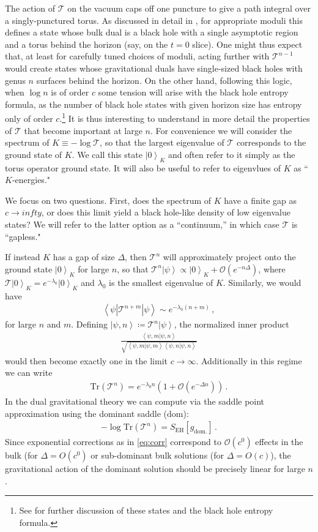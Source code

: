 \documentclass[letterpaper,12pt]{article}
\def\DM#1{{\color{red}{ [#1]}}}
\newcommand{\ban}[1]{\begin{align}#1\end{align}}
\newcommand{\corr}[1]{\left< #1\right>}
\newcommand{\Tr}{\text{Tr}}
\newcommand{\ket}[1]{\left| #1\right>}
\begin{document}
The action of $\mathcal T$ on the vacuum caps off one puncture to give a path integral over a singly-punctured torus.  As discussed in detail in \cite{Maxfield3D}, for appropriate moduli this defines a state whose bulk dual is a black hole with a single asymptotic region and a torus behind the horizon (say, on the $t=0$ slice).  \DM{Can you add a figure showing the $t=0$ surface?} One might thus expect that, at least for carefully tuned choices of moduli,  acting further with $\mathcal T^{n-1}$ would create states whose gravitational duals have single-sized black holes with genus $n$ surfaces behind the horizon.   On the other hand, following this logic, when $\log n$ is of order $c$ some tension will arise with the black hole entropy formula, as the number of black hole states with given horizon size has entropy only of order $c$.\footnote{See \cite{Maloney, Kim} for further discussion of these states and the black hole entropy formula.} It is thus interesting to understand in more detail the properties of $\mathcal T$ that become important at large $n$.  For convenience we will consider the spectrum of $K \equiv - \log \mathcal T$, so that the largest eigenvalue of $\mathcal T$ corresponds to the ground state of $K$. We call this state $\ket 0_K$ and often refer to it simply as the torus operator ground state.  It will also be useful to refer to eigenvlues of $K$ as ``$K$-energies."

We focus on two questions. First, does the spectrum of $K$ have a finite gap as $c\to infty$, or does this limit yield a black hole-like density of low eigenvalue states? We will refer to the latter option as a ``continuum,'' in which case $\mathcal T$ is ``gapless." 

If instead $K$ has a gap of size $\Delta$, then $\mathcal T^n$ will approximately project onto the ground state $\ket 0_K$ for large $n$, so that $\mathcal T^n\ket \psi \propto \ket 0_K + \mathcal O(e^{-n\Delta})$, where $\mathcal T \ket 0_K = e^{-\lambda_0} \ket 0_K$ and $\lambda_0$ is the smallest eigenvalue of $K$. Similarly, we would have
\ban{
\corr {\psi| \mathcal T^{n+m} |\psi} \sim e^{-\lambda_0 (n+m)} \, ,
}
for large $n$ and $m$. Defining $\ket{\psi,n} \coloneqq \mathcal T^n \ket \psi$, the normalized inner product
\ban{
	\frac{\corr{\psi,m|\psi,n}}{\sqrt{\corr{\psi,m|\psi,m}\corr{\psi,n|\psi,n}}} \label{eq:innerprod}
	}
would then become exactly one in the limit $c\to\infty$. Additionally in this regime we can write
\ban{
\label{eq:corr}
\Tr(\mathcal T^n) = e^{-\lambda_0 n}\left(1+\mathcal O(e^{-\Delta n})\right)\, .	
}
In the dual gravitational theory we can compute via the saddle point approximation using the dominant saddle ($\text{dom}$):
\ban{
-\log \Tr(\mathcal T^n)=S_\text{EH}[g_\text{dom.}]\, .
}
Since exponential corrections as in \eqref{eq:corr} correspond to $\mathcal O(c^0)$ effects in the bulk (for $\Delta = O(c^0)$ or sub-dominant bulk solutions (for $\Delta = O(c)$), the gravitational action of the dominant solution should be precisely linear for large $n$.
\end{document}
